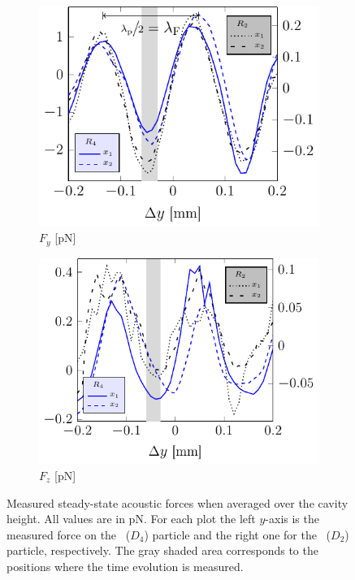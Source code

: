 \begin{figure}[H]
  \centering
  \begin{subfigure}{\figWidth}
    \centering
    \caption{$F_{y}$ [\si{\pico\newton}]}\label{subfig:TC-F_y}
    \includegraphics[]{External/avgF_y_vs_dy.pdf}
  \end{subfigure}%
  \begin{subfigure}{\figWidth}
    \centering
    \caption{$F_{z}$ [\si{\pico\newton}]}\label{subfig:TC-F_z}
    \includegraphics[]{External/avgF_z_vs_dy.pdf}
  \end{subfigure}%
  \caption{Measured steady-state acoustic forces when averaged over the cavity 
    height. All values are in \si{\pico\newton}. For each plot the left 
    $y$-axis is the measured force on the \Dfour~($D_{4}$) particle and the 
    right one for the \Dtwo~($D_{2}$) particle, respectively.
    The gray shaded area corresponds to the positions where the time evolution 
  is measured.}\label{fig:TC-averaged_forces_vs_dy}
\end{figure}

